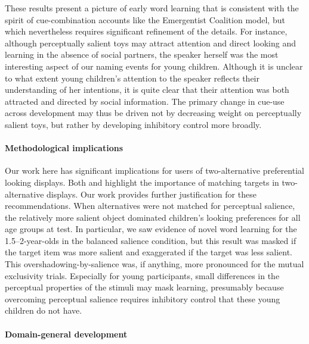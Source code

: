 \documentclass[man,floatsintext]{apa6}
\begin{document}
These results present a picture of early word learning that is consistent with the spirit of cue-combination accounts like the Emergentist Coalition model, but which nevertheless requires significant refinement of the details. For instance, although perceptually salient toys may attract attention and direct looking and learning in the absence of social partners, the speaker herself was the most interesting aspect of our naming events for young children. Although it is unclear to what extent young children's attention to the speaker reflects their understanding of her intentions, it is quite clear that their attention was both attracted and directed by social information. The primary change in cue-use across development may thus be driven not by decreasing weight on perceptually salient toys, but rather by developing inhibitory control more broadly.

\paragraph{Methodological implications}

Our work here has significant implications for users of two-alternative preferential looking displays. Both  and  highlight the importance of matching targets in two-alternative displays. Our work provides further justification for these recommendations. When alternatives were not matched for perceptual salience, the relatively more salient object dominated children's looking preferences for all age groups at test. In particular, we saw evidence of novel word learning for the 1.5--2-year-olds in the balanced salience condition, but this result was masked if the target item was more salient and exaggerated if the target was less salient. This overshadowing-by-salience was, if anything, more pronounced for the mutual exclusivity trials.  Especially for young participants, small differences in the perceptual properties of the stimuli may mask learning, presumably because overcoming perceptual salience requires inhibitory control that these young children do not have. 

\paragraph{Domain-general development}
\end{document}
